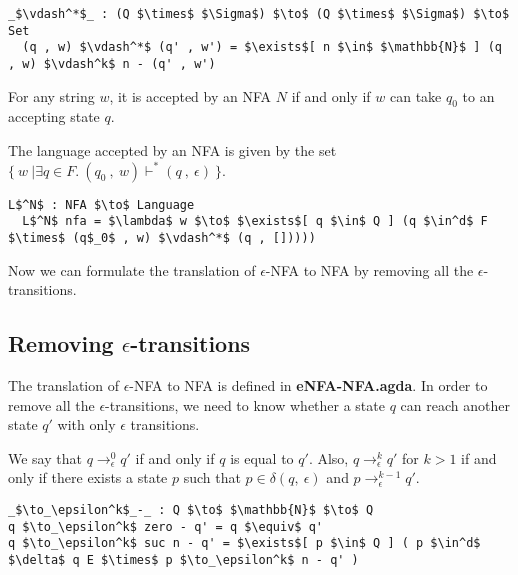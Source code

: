 \begin{lstlisting}[mathescape=true]
  _$\vdash^*$_ : (Q $\times$ $\Sigma$) $\to$ (Q $\times$ $\Sigma$) $\to$ Set
  (q , w) $\vdash^*$ (q' , w') = $\exists$[ n $\in$ $\mathbb{N}$ ] (q , w) $\vdash^k$ n - (q' , w')
\end{lstlisting}

\begin{defn}
\noindent For any string \(w\), it is accepted by an NFA \(N\)
if and only if \(w\) can take \(q_0\) to an accepting state \(q\). 
\end{defn}

\begin{defn}
\noindent The language accepted by an NFA is given by the set \(\{\ w\
| \exists q\in F.\ (q_0\ ,\ w) \vdash^* (q\ ,\ \epsilon)\ \}\). 
\end{defn}

\begin{lstlisting}[mathescape=true]
  L$^N$ : NFA $\to$ Language
  L$^N$ nfa = $\lambda$ w $\to$ $\exists$[ q $\in$ Q ] (q $\in^d$ F $\times$ (q$_0$ , w) $\vdash^*$ (q , []))))
\end{lstlisting} 

\par Now we can formulate the translation of \(\epsilon\)-NFA to NFA
by removing all the \(\epsilon\)-transitions. 


\subsection{Removing \(\epsilon\)-transitions}
\par The translation of \(\epsilon\)-NFA to NFA is defined in
\textbf{eNFA-NFA.agda}. In order to remove all the \(\epsilon\)-transitions, we need to
know whether a state \(q\) can reach another state \(q'\) with only
\(\epsilon\) transitions. 

\begin{defn}
\noindent We say that \(q \to_\epsilon^0 q'\) if and only if
\(q\) is equal to \(q'\). Also, \(q \to_\epsilon^k q'\) for \(k >
1\) if and only if there exists a state \(p\) such that \(p \in
\delta (q,\ \epsilon)\) and \(p \to_\epsilon^{k-1} q'\). 
\end{defn}

\begin{lstlisting}[mathescape=true]
_$\to_\epsilon^k$_-_ : Q $\to$ $\mathbb{N}$ $\to$ Q
q $\to_\epsilon^k$ zero - q' = q $\equiv$ q'
q $\to_\epsilon^k$ suc n - q' = $\exists$[ p $\in$ Q ] ( p $\in^d$ $\delta$ q E $\times$ p $\to_\epsilon^k$ n - q' )
\end{lstlisting}

